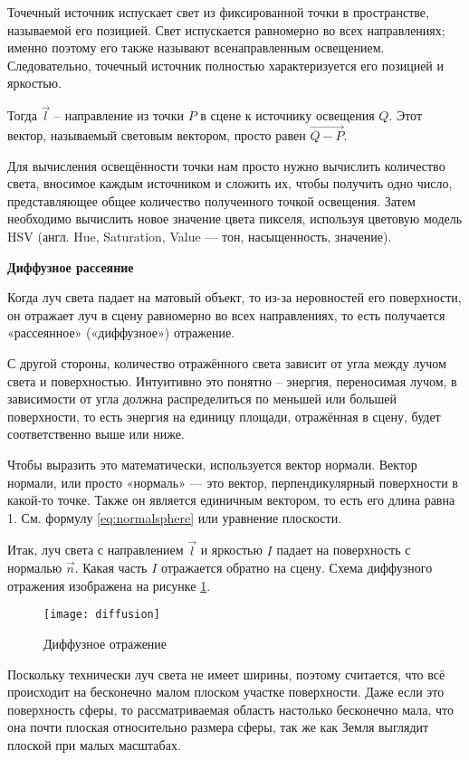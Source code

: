 Точечный источник испускает свет из фиксированной точки в пространстве, называемой его позицией. Свет испускается равномерно во всех направлениях; именно поэтому его также называют всенаправленным освещением. Следовательно, точечный источник полностью характеризуется его позицией и яркостью.

Тогда $\vec l$ -- направление из точки $P$ в сцене к источнику освещения $Q$. Этот вектор, называемый световым вектором, просто равен  $\overrightarrow{Q-P}$. 

Для вычисления освещённости точки нам просто нужно вычислить количество света, вносимое каждым источником и сложить их, чтобы получить одно число, представляющее общее количество полученного точкой освещения. Затем необходимо вычислить новое значение цвета пикселя, используя цветовую модель HSV (англ. Hue, Saturation, Value — тон, насыщенность, значение). 

\textbf{Диффузное рассеяние}

Когда луч света падает на матовый объект, то из-за неровностей его поверхности, он отражает луч в сцену равномерно во всех направлениях, то есть получается «рассеянное» («диффузное») отражение.

С другой стороны, количество отражённого света зависит от угла между лучом света и поверхностью. Интуитивно это понятно -- энергия, переносимая лучом, в зависимости от угла должна распределиться по меньшей или большей поверхности, то есть энергия на единицу площади, отражённая в сцену, будет соответственно выше или ниже. 

Чтобы выразить это математически, используется вектор нормали. Вектор нормали, или просто «нормаль» — это вектор, перпендикулярный поверхности в какой-то точке. Также он является единичным вектором, то есть его длина равна 1. См. формулу \ref{eq:normalsphere} или уравнение плоскости. 

Итак, луч света с направлением $\vec l$ и яркостью $I$ падает на поверхность с нормалью $\vec n$. Какая часть $I$ отражается обратно на сцену. Схема диффузного отражения изображена на рисунке \ref{img:diffusion}. 

\begin{figure}[H]
	\centering
	\texttt{[image: diffusion]}
	\caption{Диффузное отражение}
	\label{img:diffusion}
\end{figure}

Поскольку технически луч света не имеет ширины, поэтому считается, что всё происходит на бесконечно малом плоском участке поверхности. Даже если это поверхность сферы, то рассматриваемая область настолько бесконечно мала, что она почти плоская относительно размера сферы, так же как Земля выглядит плоской при малых масштабах.

